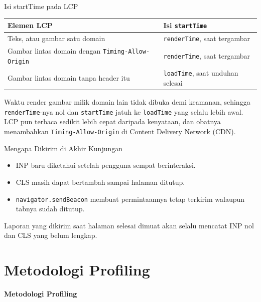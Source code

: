 \documentclass[aspectratio=169, table, 12pt]{beamer}
\begin{document}
\begin{frame}{{\Large Isi startTime pada LCP}}
  \vspace{8pt}
  \centering
  {\footnotesize
  \begin{tabularx}{\textwidth}{Yl}
    \hline
    \textbf{Elemen LCP} & \textbf{Isi \texttt{startTime}} \\
    \hline
    Teks, atau gambar satu domain & \texttt{renderTime}, saat tergambar \\
    \hline
    Gambar lintas domain dengan \texttt{Timing-Allow-Origin} & \texttt{renderTime}, saat tergambar \\
    \hline
    Gambar lintas domain tanpa header itu & \texttt{loadTime}, saat unduhan selesai \\
    \hline
  \end{tabularx}}

  \vspace{8pt}
  {\footnotesize Waktu render gambar milik domain lain tidak dibuka demi
  keamanan, sehingga \texttt{renderTime}-nya nol dan \texttt{startTime} jatuh
  ke \texttt{loadTime} yang selalu lebih awal. LCP pun terbaca sedikit lebih
  cepat daripada kenyataan, dan obatnya menambahkan \texttt{Timing-Allow-Origin}
  di Content Delivery Network (CDN).}
\end{frame}

\begin{frame}{{\Large Mengapa Dikirim di Akhir Kunjungan}}
  \vspace{14pt}
  \begin{itemize}
    \item INP baru diketahui setelah pengguna sempat berinteraksi.
    \item CLS masih dapat bertambah sampai halaman ditutup.
    \item \texttt{navigator.sendBeacon} membuat permintaannya tetap terkirim
          walaupun tabnya sudah ditutup.
  \end{itemize}
  \vspace{10pt}
  {\footnotesize Laporan yang dikirim saat halaman selesai dimuat akan selalu
  mencatat INP nol dan CLS yang belum lengkap.}
\end{frame}

\section{Metodologi Profiling}

\begin{frame}{\hfill}
  \centering
  \Huge{\textbf{Metodologi Profiling}}
\end{frame}
\end{document}
